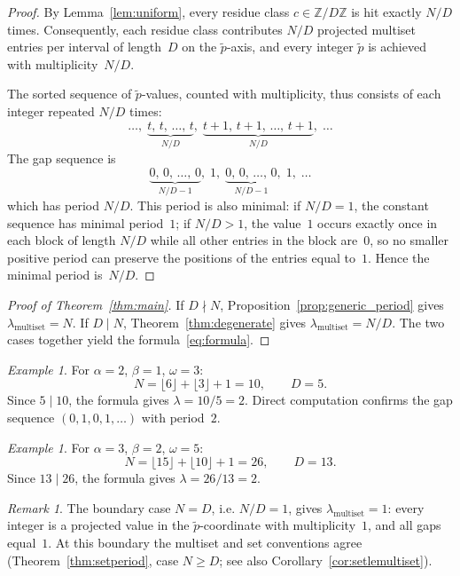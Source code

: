 \documentclass[11pt,reqno]{amsart}
\theoremstyle{plain}
\theoremstyle{definition}
\theoremstyle{remark}
\newtheorem{remark}[theorem]{Remark}
\newtheorem{example}[theorem]{Example}
\begin{document}
\begin{proof}
By Lemma~\ref{lem:uniform}, every residue class
\(c \in \mathbb{Z}/D\mathbb{Z}\) is hit exactly \(N/D\) times.  Consequently,
each residue class contributes \(N/D\) projected multiset entries per
interval of length~\(D\) on the \(\tilde{p}\)-axis, and every integer
\(\tilde{p}\) is achieved with multiplicity~\(N/D\).

The sorted sequence of \(\tilde{p}\)-values, counted with multiplicity, thus
consists of each integer repeated \(N/D\) times:
\[
    \ldots,\;
    \underbrace{t,\, t,\, \ldots,\, t}_{N/D},\;
    \underbrace{t+1,\, t+1,\, \ldots,\, t+1}_{N/D},\;
    \ldots
\]
The gap sequence is
\[
    \underbrace{0,\, 0,\, \ldots,\, 0}_{N/D - 1},\; 1,\;
    \underbrace{0,\, 0,\, \ldots,\, 0}_{N/D - 1},\; 1,\;
    \ldots
\]
which has period \(N/D\).  This period is also minimal: if
\(N/D = 1\), the constant sequence has minimal period~\(1\); if
\(N/D > 1\), the value~\(1\) occurs exactly once in each block of
length \(N/D\) while all other entries in the block are~\(0\), so no
smaller positive period can preserve the positions of the entries
equal to~\(1\).  Hence the minimal period is~\(N/D\).
\end{proof}

\begin{proof}[Proof of Theorem~\ref{thm:main}]
If \(D \nmid N\), Proposition~\ref{prop:generic_period} gives
\(\lambda_{\mathrm{multiset}} = N\). If \(D \mid N\),
Theorem~\ref{thm:degenerate} gives \(\lambda_{\mathrm{multiset}} = N/D\).
The two cases together yield the formula~\eqref{eq:formula}.
\end{proof}

\begin{example}\label{ex:degenerate}
For \(\alpha = 2\), \(\beta = 1\), \(\omega = 3\):
\[
    N = \lfloor 6 \rfloor + \lfloor 3 \rfloor + 1 = 10,
    \qquad
    D = 5.
\]
Since \(5 \mid 10\), the formula gives \(\lambda = 10/5 = 2\).
Direct computation confirms the gap sequence
\((0, 1, 0, 1, \ldots)\) with period~\(2\).
\end{example}

\begin{example}\label{ex:degenerate2}
For \(\alpha = 3\), \(\beta = 2\), \(\omega = 5\):
\[
    N = \lfloor 15 \rfloor + \lfloor 10 \rfloor + 1 = 26,
    \qquad
    D = 13.
\]
Since \(13 \mid 26\), the formula gives \(\lambda = 26/13 = 2\).
\end{example}

\begin{remark}\label{rem:boundary}
The boundary case \(N = D\), i.e. \(N/D = 1\), gives
\(\lambda_{\mathrm{multiset}} = 1\): every integer is a projected value in
the \(\tilde{p}\)-coordinate with multiplicity~\(1\), and all gaps
equal~\(1\).  At this boundary the multiset and set conventions agree
(Theorem~\ref{thm:setperiod}, case \(N \ge D\); see also
Corollary~\ref{cor:setlemultiset}).
\end{remark}
\end{document}
